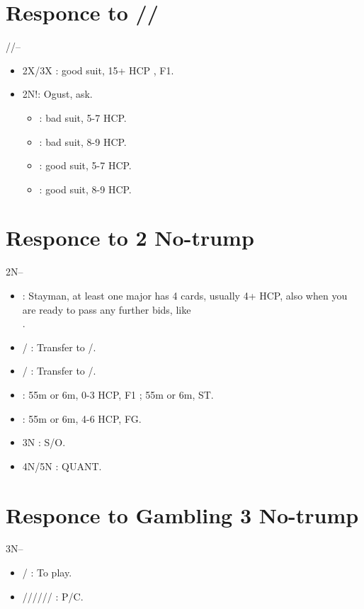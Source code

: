 \documentclass[12pt,twoside,a5paper]{report}%
\begin{document}
\chapter*{Responce to /\he{}/\sp{}}
	//-- \\
	\begin{itemize}
	\renewcommand{\labelitemi}{}	
	\item 2X/3X : good suit, 15+ HCP , F1.
	\item 2N!: Ogust, ask.
		\begin{itemize}
		\renewcommand{\labelitemi}{--}
			\item {} : bad suit, 5-7 HCP.
			\item {} : bad suit, 8-9 HCP.
			\item {} : good suit, 5-7 HCP.
			\item {} : good suit, 8-9 HCP.
		\end{itemize}
	\end{itemize}

\chapter*{Responce to 2 No-trump}
	2N--\\
	\begin{itemize}
	\renewcommand{\labelitemi}{}
	\item {}: Stayman, at least one major has 4 cards, usually 4+ HCP, also when you are ready to pass any further bids, like \\.
	\item {}/ : Transfer to /.
	\item {}/ : Transfer to /.
	\item {} : 55m or 6m, 0-3 HCP, F1 ; 55m or 6m, ST.
	\item {} : 55m or 6m, 4-6 HCP,  FG. 
	\item 3N : S/O.
	\item 4N/5N : QUANT.
	\end{itemize}

\chapter*{Responce to Gambling 3 No-trump}
	3N--\\
	\begin{itemize}
	\renewcommand{\labelitemi}{}
	\item {}/ : To play.
	\item {}////// : P/C.
	\end{itemize}
\end{document}
